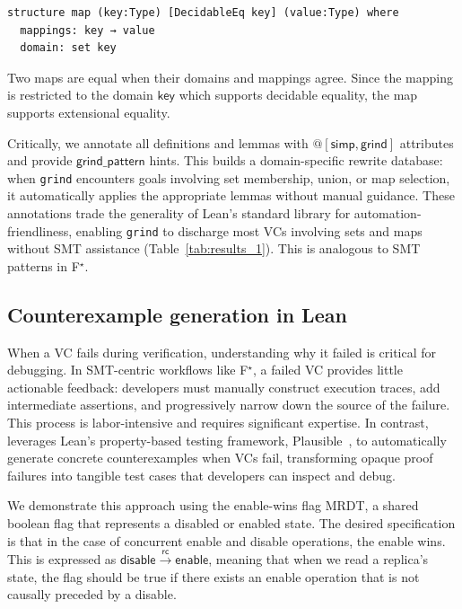 \documentclass[sigplan,twocolumn,accept]{acmart}
\newcommand{\F}[1]{\mathsf{#1}}
\newcommand{\fstar}{F$^{\star}$\xspace}
\begin{document}
\begin{lstlisting}[language=lean]
structure map (key:Type) [DecidableEq key] (value:Type) where
  mappings: key → value
  domain: set key
\end{lstlisting}

Two maps are equal when their domains and mappings agree. Since the mapping is restricted to the domain $\F{key}$ which supports decidable equality, the map supports extensional equality.

Critically, we annotate all definitions and lemmas with $\F{@[simp, grind]}$ attributes and provide $\F{grind\_pattern}$ hints. This builds a domain-specific rewrite database: when \texttt{grind} encounters goals involving set membership, union, or map selection, it automatically applies the appropriate lemmas without manual guidance. These annotations trade the generality of Lean's standard library for automation-friendliness, enabling \texttt{grind} to discharge most VCs involving sets and maps without SMT assistance (Table~\ref{tab:results_1}). This is analogous to SMT patterns in \fstar.

\subsection{Counterexample generation in Lean}

When a VC fails during verification, understanding why it failed is critical for debugging. In SMT-centric workflows like \fstar, a failed VC provides little actionable feedback: developers must manually construct execution traces, add intermediate assertions, and progressively narrow down the source of the failure. This process is labor-intensive and requires significant expertise. In contrast, \sal leverages Lean's property-based testing framework, Plausible~\cite{plausible}, to automatically generate concrete counterexamples when VCs fail, transforming opaque proof failures into tangible test cases that developers can inspect and debug.

We demonstrate this approach using the enable-wins flag MRDT, a shared boolean flag that represents a disabled or enabled state. The desired specification is that in the case of concurrent enable and disable operations, the enable wins. This is expressed as $\F{disable} \xrightarrow{\F{rc}} \F{enable}$, meaning that when we read a replica's state, the flag should be true if there exists an enable operation that is not causally preceded by a disable.
\end{document}
